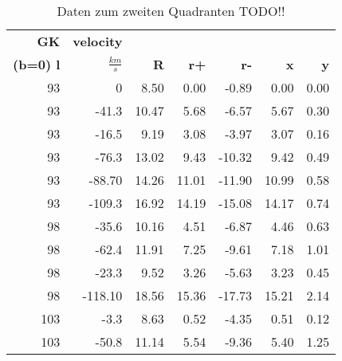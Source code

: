 \newpage
\begin{table}[H]
    \centering
    \caption{Daten zum zweiten Quadranten TODO!!}
\begin{tabular}{|r|r|r|r|r|r|r|}
    \hline
    {\textbf{GK}} & {\textbf{velocity}} & {} &   {} &   {} &    {} &    {} \\
    {\textbf{(b=0) l}} & {\textbf{$\si{}{\frac{km}{s}}$}} & {\textbf{R}} &   {\textbf{r+}} &   {\textbf{r-}} &    {\textbf{x}} &    {\textbf{y}} \\
    \hline
            93 &          0 &       8.50 &       0.00 &      -0.89 &       0.00 &       0.00 \\
    
            93 &      -41.3 &      10.47 &       5.68 &      -6.57 &       5.67 &       0.30 \\
    
            93 &      -16.5 &       9.19 &       3.08 &      -3.97 &       3.07 &       0.16 \\
    
            93 &      -76.3 &      13.02 &       9.43 &     -10.32 &       9.42 &       0.49 \\
    
            93 &     -88.70 &      14.26 &      11.01 &     -11.90 &      10.99 &       0.58 \\
    
            93 &     -109.3 &      16.92 &      14.19 &     -15.08 &      14.17 &       0.74 \\
    \hline
            98 &      -35.6 &      10.16 &       4.51 &      -6.87 &       4.46 &       0.63 \\
    
            98 &      -62.4 &      11.91 &       7.25 &      -9.61 &       7.18 &       1.01 \\
    
            98 &      -23.3 &       9.52 &       3.26 &      -5.63 &       3.23 &       0.45 \\
    
            98 &    -118.10 &      18.56 &      15.36 &     -17.73 &      15.21 &       2.14 \\
    \hline
           103 &       -3.3 &       8.63 &       0.52 &      -4.35 &       0.51 &       0.12 \\
    
           103 &      -50.8 &      11.14 &       5.54 &      -9.36 &       5.40 &       1.25 \\
    

\end{tabular}
\end{table}
